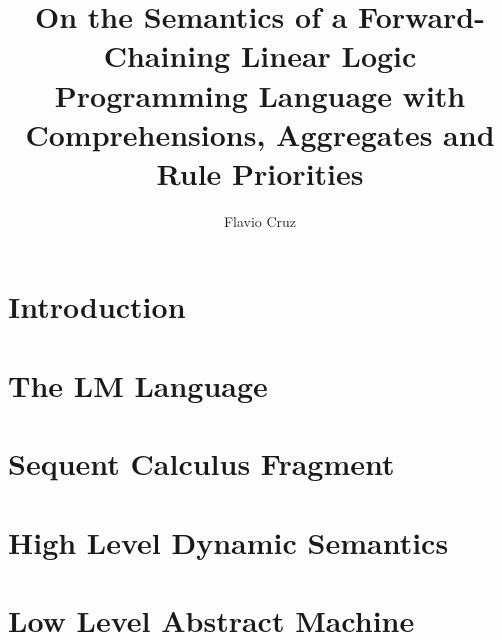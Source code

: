 \documentclass{llncs}
\begin{document}
\newcommand{\cmu}{\ensuremath{^\dag}}
\newcommand{\fcup}{\ensuremath{^\ddag}}

\title{On the Semantics of a Forward-Chaining Linear Logic Programming Language with
Comprehensions, Aggregates and Rule Priorities}
\author{Flavio Cruz}



\maketitle
\begin{abstract}

\end{abstract}
\pagestyle{headings}  %

\section{Introduction}


\section{The LM Language}


\section{Sequent Calculus Fragment}


\section{High Level Dynamic Semantics}


\section{Low Level Abstract Machine}

\end{document}
